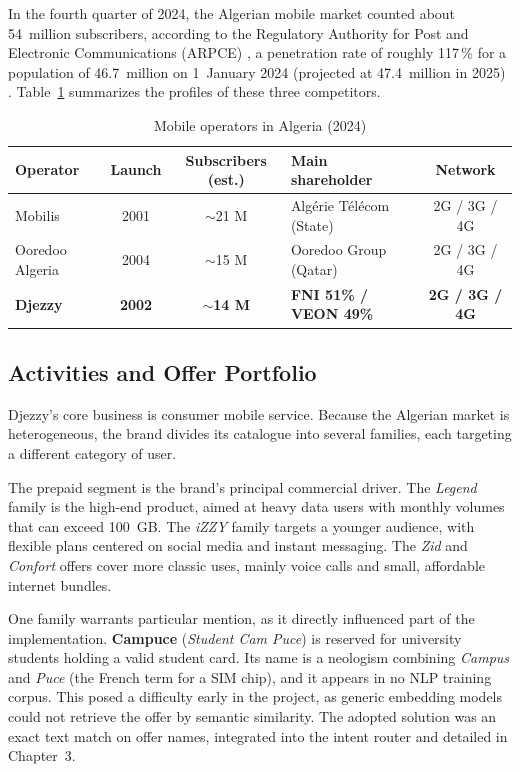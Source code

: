 \documentclass[12pt, a4paper]{report}
\newcommand{\sourced}[1]{#1}        %
\newcommand{\humantext}[1]{#1}      %
\begin{document}
\sourced{In the fourth quarter of 2024, the Algerian mobile market counted about 54~million subscribers, according to the Regulatory Authority for Post and Electronic Communications (ARPCE) \cite{arpce2024}, a penetration rate of roughly 117\,\% for a population of 46.7~million on 1~January 2024 (projected at 47.4~million in 2025) \cite{ons2025}.}     \humantext{Table~\ref{tab:operateurs_algerie} summarizes the profiles of these three competitors.}

\begin{table}[H]
\centering
\caption{Mobile operators in Algeria (2024) \cite{arpce2024}}
\label{tab:operateurs_algerie}
\begin{tabularx}{\textwidth}{l c c X c}
\toprule
\textbf{Operator} & \textbf{Launch} & \textbf{Subscribers (est.)} & \textbf{Main shareholder} & \textbf{Network} \\
\midrule
Mobilis         & 2001 & $\sim$21 M & Algérie Télécom (State)       & 2G / 3G / 4G \\
Ooredoo Algeria & 2004 & $\sim$15 M & Ooredoo Group (Qatar)         & 2G / 3G / 4G \\
\textbf{Djezzy} & \textbf{2002} & $\sim$\textbf{14 M} & \textbf{FNI 51\% / VEON 49\%} & \textbf{2G / 3G / 4G} \\
\bottomrule
\end{tabularx}
\end{table}

\subsection{Activities and Offer Portfolio}

\humantext{Djezzy's core business is consumer mobile service. Because the Algerian market is heterogeneous, the brand divides its catalogue into several families, each targeting a different category of user.}

\humantext{The prepaid segment is the brand's principal commercial driver.} \sourced{The \textit{Legend} family is the high-end product, aimed at heavy data users with monthly volumes that can exceed 100~GB. The \textit{iZZY} family targets a younger audience, with flexible plans centered on social media and instant messaging. The \textit{Zid} and \textit{Confort} offers cover more classic uses, mainly voice calls and small, affordable internet bundles.}

\humantext{One family warrants particular mention, as it directly influenced part of the implementation. \textbf{Campuce} (\textit{Student Cam Puce}) is reserved for university students holding a valid student card. Its name is a neologism combining \textit{Campus} and \textit{Puce} (the French term for a SIM chip), and it appears in no NLP training corpus. This posed a difficulty early in the project, as generic embedding models could not retrieve the offer by semantic similarity. The adopted solution was an exact text match on offer names, integrated into the intent router and detailed in Chapter~3.}
\end{document}
